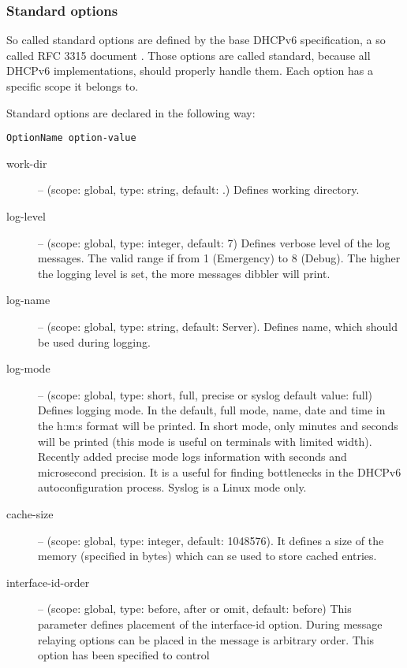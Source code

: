 \subsubsection{Standard options}

So called standard options are defined by the base DHCPv6 specification,
a so called RFC 3315 document \cite{rfc3315}. Those options are
called standard, because all DHCPv6 implementations, should properly
handle them. Each option has a specific scope it belongs to. 

Standard options are declared in the following way:

\begin{verbatim}
OptionName option-value
\end{verbatim}

\begin{description}
 \item[work-dir] -- (scope: global, type: string, default: .) Defines working
	    directory.
 \item[log-level] -- (scope: global, type: integer, default: 7) Defines
	    verbose level of the log messages. The valid range if
	    from 1 (Emergency) to 8 (Debug). The higher the logging
	    level is set, the more messages dibbler will print.
 \item[log-name] -- (scope: global, type: string, default: Server). Defines 
	    name, which should be used during logging.
 \item[log-mode] -- (scope: global, type: short, full, precise or syslog
	    default value: full) Defines logging mode. In the
	    default, full mode, name, date and time in the h:m:s format
	    will be printed. In short mode, only minutes and
	    seconds will be printed (this mode is useful on
	    terminals with limited width). Recently added precise
	    mode logs information with seconds and microsecond
	    precision. It is a useful for finding bottlenecks in
	    the DHCPv6 autoconfiguration process. Syslog is a Linux
	    mode only.
 \item[cache-size] -- (scope: global, type: integer, default:
	    1048576). It defines a size of the memory (specified in
            bytes) which can se used to store cached entries.
\item[interface-id-order] -- (scope: global, type: before, after or omit, 
        default: before) This parameter defines placement of the
        interface-id option. During message relaying options can be placed in the 
        message is arbitrary order. This option has been specified to control

\end{description}
